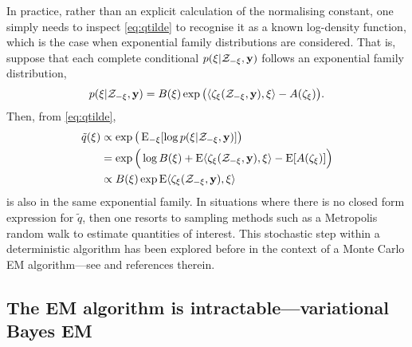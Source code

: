 In practice, rather than an explicit calculation of the normalising constant, one simply needs to inspect \cref{eq:qtilde} to recognise it as a known log-density function, which is the case when exponential family distributions are considered.
That is, suppose that each complete conditional $p(\xi|{\mathcal Z}_{-\xi}, {\mathbf y})$ follows an exponential family distribution,
\[
  p(\xi|{\mathcal Z}_{-\xi}, {\mathbf y}) = B(\xi)\exp \big(\langle\zeta_\xi({\mathcal Z}_{-\xi}, {\mathbf y}) , \xi\rangle - A(\zeta_\xi) \big).
\]
Then, from \cref{eq:qtilde},
\begin{align*}
  \tilde q(\xi)
  &\propto \exp\big(\operatorname{E}_{-\xi}[\log p(\xi|{\mathcal Z}_{-\xi}, {\mathbf y})] \big) \\
  &= \exp \Big(\log B(\xi) + \operatorname{E} \langle\zeta_\xi({\mathcal Z}_{-\xi}, {\mathbf y}) , \xi\rangle - \operatorname{E} [ A(\zeta_\xi) ] \Big) \\
  &\propto B(\xi)\exp \operatorname{E}\langle\zeta_\xi({\mathcal Z}_{-\xi}, {\mathbf y}) , \xi\rangle
\end{align*}
is also in the same exponential family.
In situations where there is no closed form expression for $\tilde q$, then one resorts to sampling methods such as a Metropolis random walk to estimate quantities of interest.
This stochastic step within a deterministic algorithm has been explored before in the context of a Monte Carlo EM algorithm---see \citet[§4, pp. 537--538]{meng1997algorithm} and references therein.

\subsection{The EM algorithm is intractable---variational Bayes EM}












